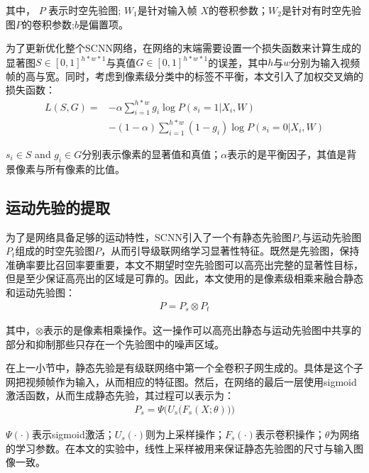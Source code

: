 其中， $P$ 表示时空先验图; $W_1$是针对输入帧 $X$的卷积参数；$W_2$是针对有时空先验图$P$的卷积参数;$b$是偏置项。

为了更新优化整个SCNN网络，在网络的末端需要设置一个损失函数来计算生成的显著图$S \in [0,1]^{h*w*1}$与真值$G \in [0,1]^{h*w*1}$的误差，其中$h$与$w$分别为输入视频帧的高与宽。同时，考虑到像素级分类中的标签不平衡，本文引入了加权交叉熵的损失函数：
\begin{equation}
 \label{eq3}
 \begin{aligned}
   L(S, G) = &-\alpha \sum^{h*w}_{i=1} g_i \log P(s_i = 1|X_i, W) \\
             &- (1 - \alpha) \sum^{h*w}_{i=1} (1-g_i)\log P(s_i = 0|X_i, W)
   \end{aligned}
\end{equation}

$s_i \in S$ and $ g_i \in G$分别表示像素的显著值和真值；$\alpha$表示的是平衡因子，其值是背景像素与所有像素的比值。

\subsection{运动先验的提取}
为了是网络具备足够的运动特性，SCNN引入了一个有静态先验图$P_s$与运动先验图$P_t$组成的时空先验图$P$，从而引导级联网络学习显著性特征。既然是先验图，保持准确率要比召回率要重要，本文不期望时空先验图可以高亮出完整的显著性目标，但是至少保证高亮出的区域是可靠的。因此，本文使用的是像素级相乘来融合静态和运动先验图：
\begin{equation}
 \label{eq3_3}
 \begin{aligned}
   P = P_s \otimes P_t
   \end{aligned}
\end{equation}

其中，$\otimes$表示的是像素相乘操作。这一操作可以高亮出静态与运动先验图中共享的部分和抑制那些只存在一个先验图中的噪声区域。

在上一小节中，静态先验是有级联网络中第一个全卷积子网生成的。具体是这个子网把视频帧作为输入，从而相应的特征图。然后，在网络的最后一层使用sigmoid激活函数，从而生成静态先验，其过程可以表示为：
\begin{equation}
 \label{eq3_1}
 \begin{aligned}
   P_s = \Psi\bigg(U_{s}\big(F_{s}(X;\theta)\big)\bigg)
   \end{aligned}
\end{equation}

$\Psi(\cdot)$表示sigmoid激活；$U_{s}(\cdot)$则为上采样操作；$F_ {s}(\cdot)$表示卷积操作；$\theta$为网络的学习参数。在本文的实验中，线性上采样被用来保证静态先验图的尺寸与输入图像一致。

